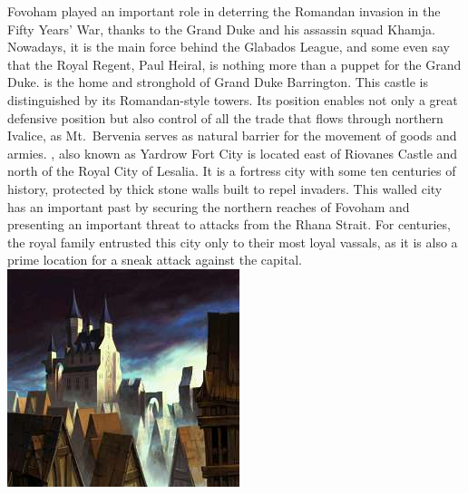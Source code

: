 Fovoham played an important role in deterring the Romandan invasion in the Fifty Years' War, thanks to the Grand Duke and his assassin squad Khamja. Nowadays, it is the main force behind the Glabados League, and some even say that the Royal Regent, Paul Heiral, is nothing more than a puppet for the
Grand Duke.
 is the home and stronghold of Grand Duke Barrington. 
This castle is distinguished by its Romandan-style towers.
Its position enables not only a great defensive position but also control of all the trade that flows through northern Ivalice, as Mt.~Bervenia serves as natural barrier for the movement of goods and armies.
, also known as Yardrow Fort City is located east of Riovanes Castle and north of the Royal City of Lesalia. It is a fortress city with some ten centuries of history, protected by thick stone walls built to repel invaders. 
This walled city has an important past by securing the northern reaches of Fovoham and presenting an important threat to attacks from the Rhana Strait. 
For centuries, the royal family entrusted this city only to their most loyal vassals, as it is also a prime location for a sneak attack against the capital.
%
\newpage
%
\vspace*{\fill}
\includegraphics[width=\columnwidth]{./art/worldbook/riovanes.jpg}
%
\vfill
{}
